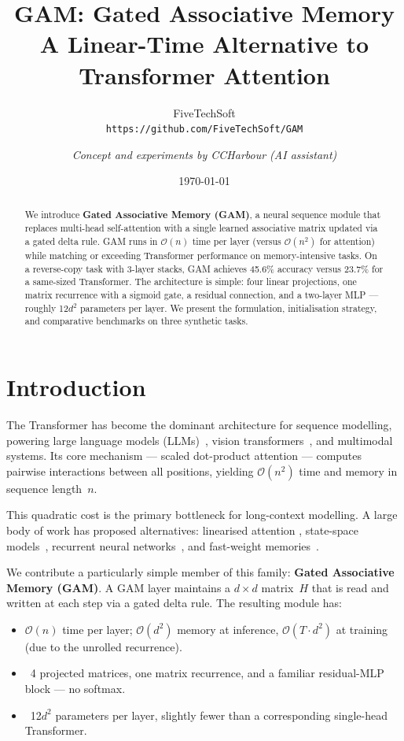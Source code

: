 \documentclass[11pt,a4paper]{article}
\title{GAM: Gated Associative Memory \\
\large A Linear-Time Alternative to Transformer Attention}
\author{%
  FiveTechSoft \\
  \texttt{https://github.com/FiveTechSoft/GAM} \\
  \and
  \textit{Concept and experiments by CCHarbour (AI assistant)}
}
\date{\today}
\begin{document}
\maketitle

\begin{abstract}
We introduce \textbf{Gated Associative Memory (GAM)}, a neural sequence
module that replaces multi-head self-attention with a single learned
associative matrix updated via a gated delta rule.  GAM runs in
$\mathcal{O}(n)$ time per layer (versus $\mathcal{O}(n^2)$ for attention)
while matching or exceeding Transformer performance on memory-intensive
tasks.  On a reverse-copy task with 3-layer stacks, GAM achieves 45.6\%
accuracy versus 23.7\% for a same-sized Transformer.  The architecture
is simple: four linear projections, one matrix recurrence with a
sigmoid gate, a residual connection, and a two-layer MLP --- roughly
12$d^2$ parameters per layer.  We present the formulation, initialisation
strategy, and comparative benchmarks on three synthetic tasks.
\end{abstract}

\section{Introduction}
\label{sec:intro}

The Transformer \cite{vaswani2017attention} has become the dominant
architecture for sequence modelling, powering large language models
(LLMs)~\cite{brown2020language}, vision transformers~\cite{dosovitskiy2020image},
and multimodal systems.  Its core mechanism --- scaled dot-product
attention --- computes pairwise interactions between all positions,
yielding $\mathcal{O}(n^2)$ time and memory in sequence length~$n$.

This quadratic cost is the primary bottleneck for long-context modelling.
A large body of work has proposed alternatives: linearised attention
\cite{katharopoulos2020transformers},
state-space models~\cite{gu2023mamba},
recurrent neural networks~\cite{peng2023rwkv},
and fast-weight memories~\cite{schlag2021linear}.

We contribute a particularly simple member of this family:
\textbf{Gated Associative Memory (GAM)}.  A GAM layer maintains a
$d\times d$ matrix~$H$ that is read and written at each step via a
gated delta rule.  The resulting module has:
\begin{itemize}[nosep]
  \item $\mathcal{O}(n)$ time per layer; $\mathcal{O}(d^2)$ memory at
        inference, $\mathcal{O}(T \cdot d^2)$ at training (due to the
        unrolled recurrence).
  \item ~4 projected matrices, one matrix recurrence, and a familiar
        residual-MLP block --- no softmax.
  \item ~12$d^2$ parameters per layer, slightly fewer than a
        corresponding single-head Transformer.
\end{itemize}
\end{document}
